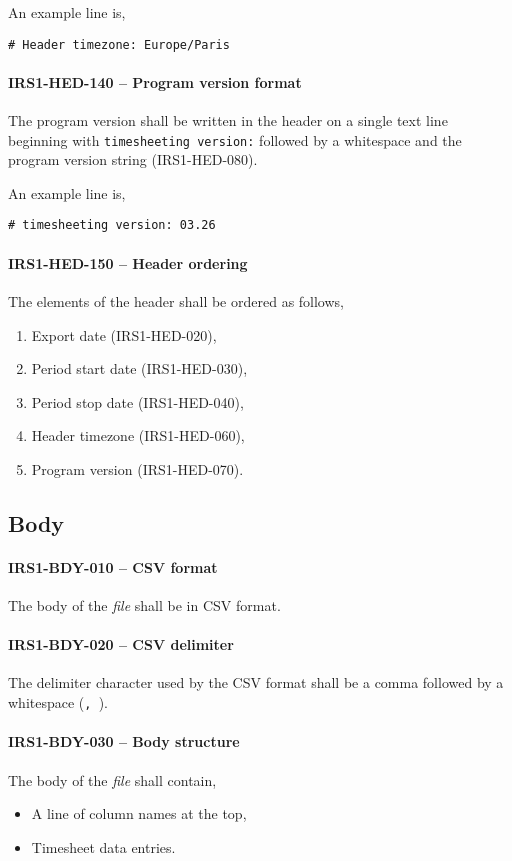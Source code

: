An example line is,
\begin{lstlisting}[numbers=none]
  # Header timezone: Europe/Paris
\end{lstlisting}

\paragraph{IRS1-HED-140 -- Program version format}
The program version shall be written in the header on a single text line
beginning with \lstinline{timesheeting version:} followed by a whitespace
and the program version string (IRS1-HED-080).

An example line is,
\begin{lstlisting}[numbers=none]
  # timesheeting version: 03.26
\end{lstlisting}

\paragraph{IRS1-HED-150 -- Header ordering}
The elements of the header shall be ordered as follows,
\begin{enumerate}
\item Export date (IRS1-HED-020),
\item Period start date (IRS1-HED-030),
\item Period stop date (IRS1-HED-040),
\item Header timezone (IRS1-HED-060),
\item Program version (IRS1-HED-070).
\end{enumerate}

\subsection{Body}
\paragraph{IRS1-BDY-010 -- CSV format}
The body of the \emph{file} shall be in \gls{CSV} format.

\paragraph{IRS1-BDY-020 -- CSV delimiter}
The delimiter character used by the \gls{CSV} format shall be a comma followed
by a whitespace (\lstinline{, }).

\paragraph{IRS1-BDY-030 -- Body structure}
The body of the \emph{file} shall contain,
\begin{itemize}
\item A line of column names at the top,
\item Timesheet data entries.
\end{itemize}

